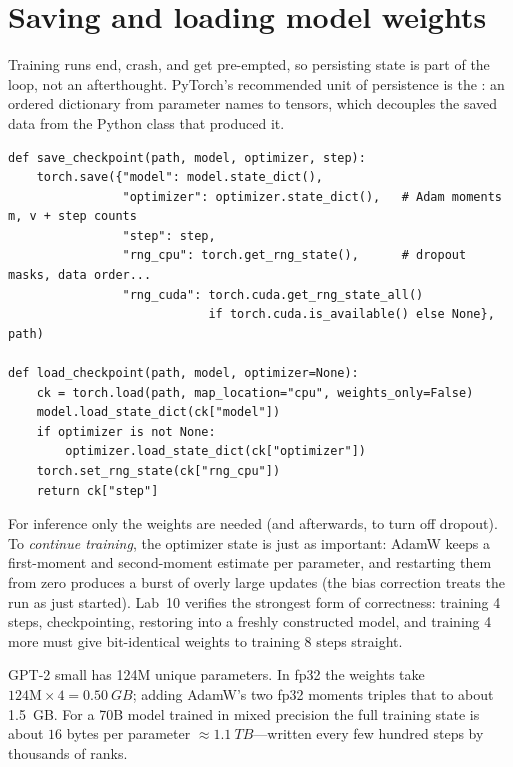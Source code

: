 \section{Saving and loading model weights}\label{sec:pretrain:save}

Training runs end, crash, and get pre-empted, so persisting state is part of the loop, not an
afterthought. PyTorch's recommended unit of persistence is the : an ordered
dictionary from parameter names to tensors, which decouples the saved data from the Python
class that produced it.

\begin{lstlisting}[caption={Saving and restoring \emph{all} training state (Lab 10, Task 5).},label={lst:pretrain:ckpt}]
def save_checkpoint(path, model, optimizer, step):
    torch.save({"model": model.state_dict(),
                "optimizer": optimizer.state_dict(),   # Adam moments m, v + step counts
                "step": step,
                "rng_cpu": torch.get_rng_state(),      # dropout masks, data order...
                "rng_cuda": torch.cuda.get_rng_state_all()
                            if torch.cuda.is_available() else None}, path)

def load_checkpoint(path, model, optimizer=None):
    ck = torch.load(path, map_location="cpu", weights_only=False)
    model.load_state_dict(ck["model"])
    if optimizer is not None:
        optimizer.load_state_dict(ck["optimizer"])
    torch.set_rng_state(ck["rng_cpu"])
    return ck["step"]
\end{lstlisting}

For inference only the weights are needed (and  afterwards, to turn off
dropout). To \emph{continue training}, the optimizer state is just as important: AdamW keeps a
first-moment and second-moment estimate per parameter, and restarting them from zero produces
a burst of overly large updates (the bias correction treats the run as just started). Lab~10
verifies the strongest form of correctness: training 4 steps, checkpointing, restoring into a
freshly constructed model, and training 4 more must give bit-identical weights to training 8
steps straight.

\begin{napkinmath}
GPT-2 small has 124M unique parameters. In fp32 the weights take $124\text{M}\times 4 =
\SI{0.50}{GB}$; adding AdamW's two fp32 moments triples that to about \SI{1.5}{GB}. For a 70B
model trained in mixed precision the full training state is about $16$ bytes per parameter
$\approx \SI{1.1}{TB}$---written every few hundred steps by thousands of ranks.
\end{napkinmath}

